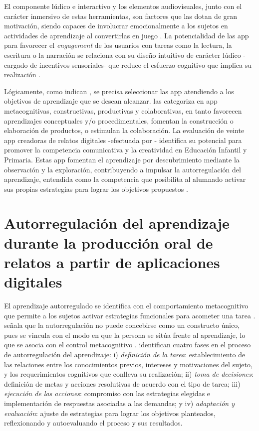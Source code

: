 \documentclass[spanish]{textolivre}
\begin{document}
El componente lúdico e interactivo y los elementos audiovisuales, junto con el carácter inmersivo de estas herramientas, son factores que las dotan de gran motivación, siendo capaces de involucrar emocionalmente a los sujetos en actividades de aprendizaje al convertirlas en juego \cite{barton_immediate_2020,marsh_play_2018,strasser_towards_2015}. La potencialidad de las app para favorecer el \textit{engagement} de los usuarios con tareas como la lectura, la escritura o la narración se relaciona con su diseño intuitivo de carácter lúdico -cargado de incentivos sensoriales- que reduce el esfuerzo cognitivo que implica su realización \cite{ghalebandi_engaging_2019,tavernier_emerging_2020}.

Lógicamente, como indican \textcite{papadakis_educational_2018}, se precisa seleccionar las app atendiendo a los objetivos de aprendizaje que se desean alcanzar. \textcite{kay_creating_2018} las categoriza en app metacognitivas, constructivas, productivas y colaborativas, en tanto favorecen aprendizajes conceptuales y/o procedimentales, fomentan la construcción o elaboración de productos, o estimulan la colaboración. La evaluación de veinte app creadoras de relatos digitales -efectuada por \textcite{del-moral_evaluacion_2019}- identifica su potencial para promover la competencia comunicativa y la creatividad en Educación Infantil y Primaria. Estas app fomentan el aprendizaje por descubrimiento mediante la observación y la exploración, contribuyendo a impulsar la autorregulación del aprendizaje, entendida como la competencia que posibilita al alumnado activar sus propias estrategias para lograr los objetivos propuestos \cite{panadero_teorias_2014}. 


\section{Autorregulación del aprendizaje durante la producción oral de relatos a partir de aplicaciones digitales}\label{sec-autorregulacion}

El aprendizaje autorregulado se identifica con el comportamiento metacognitivo que permite a los sujetos activar estrategias funcionales para acometer una tarea \cite{hacker_metacognition_1998}. \textcite{kaplan_clarifying_2008} señala que la autorregulación no puede concebirse como un constructo único, pues se vincula con el modo en que la persona se sitúa frente al aprendizaje, lo que se asocia con el control metacognitivo \cite{winne_inherent_1995}. \textcite{alvarez_valdivia_evaluar_2009,berridi_ramirez_estrategias_2017} identifican cuatro fases en el proceso de autorregulación del aprendizaje: i) \textit{definición de la tarea}: establecimiento de las relaciones entre los conocimientos previos, intereses y motivaciones del sujeto, y los requerimientos cognitivos que conlleva su realización; ii) \textit{toma de decisiones}: definición de metas y acciones resolutivas de acuerdo con el tipo de tarea; iii) \textit{ejecución de las acciones}: compromiso con las estrategias elegidas e implementación de respuestas asociadas a las demandas; y iv) \textit{adaptación y evaluación}: ajuste de estrategias para lograr los objetivos planteados, reflexionando y autoevaluando el proceso y sus resultados.
\end{document}
